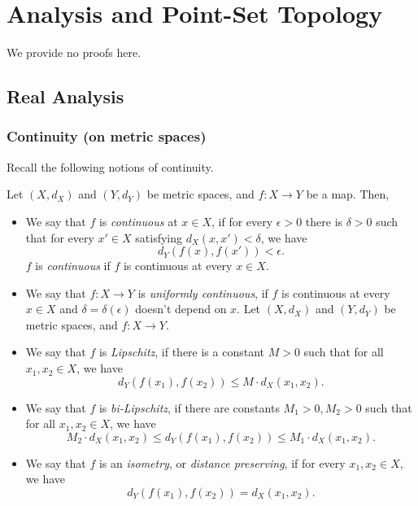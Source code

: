 \section{Analysis and Point-Set Topology}

We provide no proofs here.

\subsection{Real Analysis}

\subsubsection{Continuity (on metric spaces)}

Recall the following notions of continuity.

\begin{df}
    Let $(X, d_X)$ and $(Y, d_Y)$ be metric spaces, and $f \colon X \rightarrow Y$ be a map. Then, 
    \begin{itemize}
        \item We say that $f$ is \emph{continuous} at $x \in X$, 
        if for every $\epsilon > 0$ there is $\delta > 0$ such that for every $x' \in X$ 
        satisfying $d_X(x, x') < \delta$, we have 
        \[
        d_Y(f(x), f(x')) < \epsilon.
        \]
        $f$ is \emph{continuous} if $f$ is continuous at every $x \in X$.
        \item We say that $f \colon X \rightarrow Y$ is \emph{uniformly continuous}, 
        if $f$ is continuous at every $x \in X$ and $\delta = \delta (\epsilon)$ doesn't depend on $x$.
        Let $(X, d_X)$ and $(Y, d_Y)$ be metric spaces, and $f \colon X \rightarrow Y$. 
        \item We say that $f$ is \emph{Lipschitz}, if there is a constant $M > 0$ such that for all $x_1, x_2 \in X$, we have
        \[
        d_Y(f(x_1), f(x_2)) \leq M \cdot d_X(x_1, x_2).
        \]
        \item We say that $f$ is \emph{bi-Lipschitz}, if there are constants $M_1 > 0, M_2 > 0$ such that for all $x_1, x_2 \in X$, we have 
        \[
        M_2 \cdot d_X (x_1, x_2) \leq d_Y(f(x_1), f(x_2)) \leq M_1 \cdot d_X (x_1, x_2).
        \]
        \item We say that $f$ is an \emph{isometry}, or \emph{distance preserving}, if for every $x_1, x_2 \in X$, we have 
        \[
        d_Y(f(x_1), f(x_2)) = d_X(x_1, x_2).
        \]
    \end{itemize}
\end{df}

